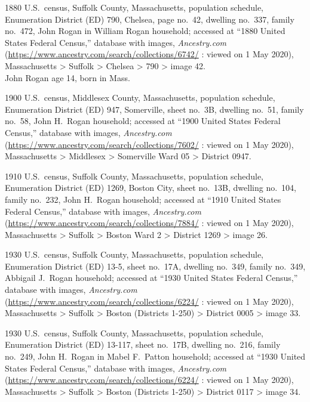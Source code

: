 \begin{thebibliography}{999}
	1880 U.S.\ census, Suffolk County, Massachusetts, population schedule, Enumeration District (ED) 790, Chelsea, page no.\ 42, dwelling no.\ 337, family no.\ 472, John Rogan in William Rogan household; accessed at ``1880 United States Federal Census,'' database with images, \textit{Ancestry.com} (\url{https://www.ancestry.com/search/collections/6742/} : viewed on 1 May 2020), Massachusetts > Suffolk > Chelsea > 790 > image 42.\\
	John Rogan age 14, born in Mass.
	
	1900 U.S.\ census, Middlesex County, Massachusetts, population schedule, Enumeration District (ED) 947, Somerville, sheet no.\ 3B, dwelling no.\ 51, family no.\ 58, John H.\ Rogan household; accessed at ``1900 United States Federal Census,'' database with images, \textit{Ancestry.com} (\url{https://www.ancestry.com/search/collections/7602/} : viewed on 1 May 2020), Massachusetts > Middlesex > Somerville Ward 05 > District 0947.
	
	1910 U.S.\ census, Suffolk County, Massachusetts, population schedule, Enumeration District (ED) 1269, Boston City, sheet no.\ 13B, dwelling no.\ 104, family no.\ 232, John H.\ Rogan household; accessed at ``1910 United States Federal Census,'' database with images, \textit{Ancestry.com} (\url{https://www.ancestry.com/search/collections/7884/} : viewed on 1 May 2020), Massachusetts > Suffolk > Boston Ward 2 > District 1269 > image 26.
	
	1930 U.S.\ census, Suffolk County, Massachusetts, population schedule, Enumeration District (ED) 13-5, sheet no.\ 17A, dwelling no.\ 349, family no.\ 349, Abbigail J.\ Rogan household; accessed at ``1930 United States Federal Census,'' database with images, \textit{Ancestry.com} (\url{https://www.ancestry.com/search/collections/6224/} : viewed on 1 May 2020), Massachusetts > Suffolk > Boston (Districts 1-250) > District 0005 > image 33.
	
	1930 U.S.\ census, Suffolk County, Massachusetts, population schedule, Enumeration District (ED) 13-117, sheet no.\ 17B, dwelling no.\ 216, family no.\ 249, John H.\ Rogan in Mabel F.\ Patton household; accessed at ``1930 United States Federal Census,'' database with images, \textit{Ancestry.com} (\url{https://www.ancestry.com/search/collections/6224/} : viewed on 1 May 2020), Massachusetts > Suffolk > Boston (Districts 1-250) > District 0117 > image 34.
	

\end{thebibliography}
